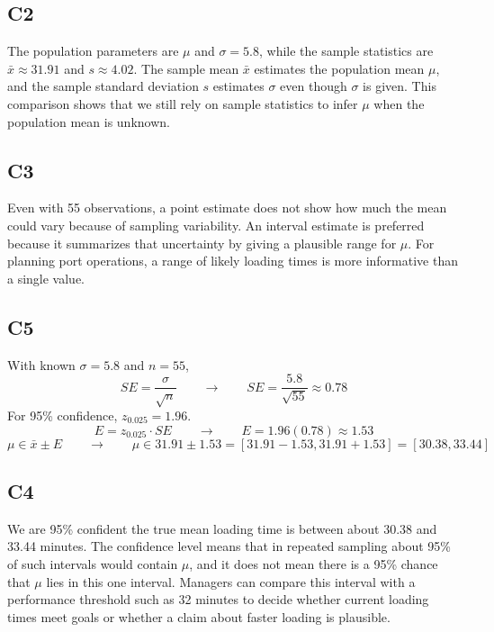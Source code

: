\begin{ExamProblems}
		\subsection*{C2}
		The population parameters are $\mu$ and $\sigma = 5.8$, while the sample statistics are $\bar{x} \approx 31.91$ and $s \approx 4.02$. The sample mean $\bar{x}$ estimates the population mean $\mu$, and the sample standard deviation $s$ estimates $\sigma$ even though $\sigma$ is given. This comparison shows that we still rely on sample statistics to infer $\mu$ when the population mean is unknown.

		\subsection*{C3}
		Even with 55 observations, a point estimate does not show how much the mean could vary because of sampling variability. An interval estimate is preferred because it summarizes that uncertainty by giving a plausible range for $\mu$. For planning port operations, a range of likely loading times is more informative than a single value.

		\subsection*{C5}
		With known $\sigma = 5.8$ and $n=55$,
		\[
		SE = \frac{\sigma}{\sqrt{n}} \qquad \longrightarrow \qquad SE = \frac{5.8}{\sqrt{55}} \approx 0.78
		\]
		For 95\% confidence, $z_{0.025}=1.96$.
		\[
		E = z_{0.025} \cdot SE \qquad \longrightarrow \qquad E = 1.96(0.78) \approx 1.53
		\]
		\[
		\mu \in \bar{x} \pm E \qquad \longrightarrow \qquad \mu \in 31.91 \pm 1.53 = [31.91 - 1.53, 31.91 + 1.53] = [30.38, 33.44]
		\]

		\subsection*{C4}
		We are 95\% confident the true mean loading time is between about 30.38 and 33.44 minutes. The confidence level means that in repeated sampling about 95\% of such intervals would contain $\mu$, and it does not mean there is a 95\% chance that $\mu$ lies in this one interval. Managers can compare this interval with a performance threshold such as 32 minutes to decide whether current loading times meet goals or whether a claim about faster loading is plausible.
	\end{ExamProblems}

